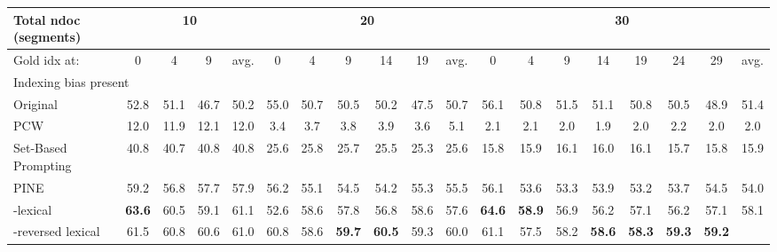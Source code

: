 \begin{table*}[!t]

\resizebox{\linewidth}{!}
{
\begin{tabular}{@{}lcccccccccccccccccc@{}}
\toprule
\multicolumn{1}{l|}{Total ndoc (segments)} &
  \multicolumn{4}{c|}{10} &
  \multicolumn{6}{c|}{20} &
  \multicolumn{8}{c}{30} \\ \midrule
\multicolumn{1}{l|}{Gold idx at: } &
  0 &
  4 &
  9 &
  \multicolumn{1}{c|}{avg.} &
  0 &
  4 &
  9 &
  14 &
  19 &
  \multicolumn{1}{c|}{avg.} &
  0 &
  4 &
  9 &
  14 &
  19 &
  24 &
  29 &
  avg. \\ \midrule
\multicolumn{19}{l}{Indexing bias present} \\ \midrule
\multicolumn{1}{l|}{Original} &
  52.8 &
  51.1 &
  46.7 &
  \multicolumn{1}{c|}{50.2} &
  55.0 &
  50.7 &
  50.5 &
  50.2 &
  47.5 &
  \multicolumn{1}{c|}{50.7} &
  56.1 &
  50.8 &
  51.5 &
  51.1 &
  50.8 &
  50.5 &
  48.9 &
  51.4 \\
\multicolumn{1}{l|}{PCW} &
  12.0 &
  11.9 &
  12.1 &
  \multicolumn{1}{c|}{12.0} &
   \phantom{0}3.4 &
   \phantom{0}3.7 &
   \phantom{0}3.8 &
   \phantom{0}3.9 &
   \phantom{0}3.6 &
  \multicolumn{1}{c|}{ \phantom{0}5.1} &
   \phantom{0}2.1 &
   \phantom{0}2.1 &
   \phantom{0}2.0 &
   \phantom{0}1.9 &
   \phantom{0}2.0 &
   \phantom{0}2.2 &
   \phantom{0}2.0 &
   \phantom{0}2.0 \\
\multicolumn{1}{l|}{Set-Based Prompting} &
  40.8 &
  40.7 &
  40.8 &
  \multicolumn{1}{c|}{40.8} &
  25.6 &
  25.8 &
  25.7 &
  25.5 &
  25.3 &
  \multicolumn{1}{c|}{25.6} &
  15.8 &
  15.9 &
  16.1 &
  16.0 &
  16.1 &
  15.7 &
  15.8 &
  15.9 \\
\multicolumn{1}{l|}{PINE} &
  59.2 &
  56.8 &
  57.7 &
  \multicolumn{1}{c|}{57.9} &
  56.2 &
  55.1 &
  54.5 &
  54.2 &
  55.3 &
  \multicolumn{1}{c|}{55.5} &
  56.1 &
  53.6 &
  53.3 &
  53.9 &
  53.2 &
  53.7 &
  54.5 &
  54.0 \\
\multicolumn{1}{l|}{\ours{}-lexical} &
  \textbf{63.6} &
  60.5 &
  59.1 &
  \multicolumn{1}{c|}{61.1} &
  52.6 &
  58.6 &
  57.8 &
  56.8 &
  58.6 &
  \multicolumn{1}{c|}{57.6} &
  \textbf{64.6} &
  \textbf{58.9} &
  56.9 &
  56.2 &
  57.1 &
  56.2 &
  57.1 &
  58.1 \\
\multicolumn{1}{l|}{\ours{}-reversed lexical} &
  61.5 &
  60.8 &
  60.6 &
  \multicolumn{1}{c|}{61.0} &
  60.8 &
  58.6 &
  \textbf{59.7} &
  \textbf{60.5} &
  59.3 &
  \multicolumn{1}{c|}{60.0} &
  61.1 &
  57.5 &
  58.2 &
  \textbf{58.6} &
  \textbf{58.3} &
  \textbf{59.3} &
  \textbf{59.2} &

\end{tabular}}
\end{table*}

